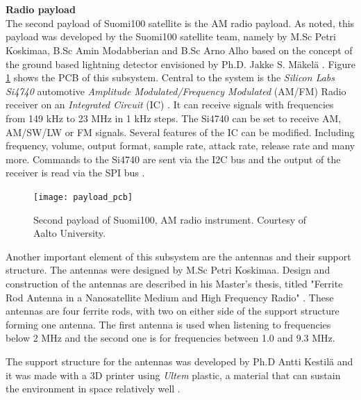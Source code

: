 \documentclass[english,12pt,a4paper,pdftex,elec,utf8]{aaltothesis}
\begin{document}
\\
\\ 
\textbf{Radio payload}\\
The second payload of Suomi100 satellite is the AM radio payload. As noted, this payload was developed by the Suomi100 satellite team, namely by M.Sc Petri Koskimaa, B.Sc Amin Modabberian and B.Sc Arno Alho based on the concept of the ground based lightning detector envisioned by Ph.D. Jakke S. Mäkelä \cite{jakke1, jakke2, jakke3, jakke4}. Figure \ref{radiopayload} shows the PCB of this subsystem. Central to the system is the \textit{Silicon Labs Si4740} automotive \textit{Amplitude Modulated/Frequency Modulated} (AM/FM) Radio receiver on an \textit{Integrated Circuit} (IC) \cite{siinfo}. It can receive signals with frequencies from 149 kHz to 23 MHz in 1 kHz steps. The Si4740 can be set to receive AM, AM/SW/LW or FM signals. Several features of the IC can be modified. Including frequency, volume, output format, sample rate, attack rate, release rate and many more. 
Commands to the Si4740 are sent via the I2C bus and the output of the receiver is read via the SPI bus \cite{sids}. \par  
\begin{figure}[h!]
\centering
\texttt{[image: payload\_pcb]}
\caption{Second payload of Suomi100, AM radio instrument. Courtesy of Aalto University.}
\label{radiopayload}
\end{figure}
Another important element of this subsystem are the antennas and their support structure. The antennas were designed by M.Sc Petri Koskimaa. Design and construction of the antennas are described in his Master's thesis, titled "Ferrite Rod Antenna in a Nanosatellite
Medium and High Frequency Radio" \cite{petridippa}. These antennas are four ferrite rods, with two on either side of the support structure forming one antenna. The first antenna is used when listening to frequencies below 2 MHz and the second one is for frequencies between 1.0 and 9.3 MHz.\par 
The support structure for the antennas was developed by Ph.D Antti Kestilä and it was made with a 3D printer using \textit{Ultem} plastic, a material that can sustain the environment in space relatively well \cite{ultem}.\par 
\end{document}
